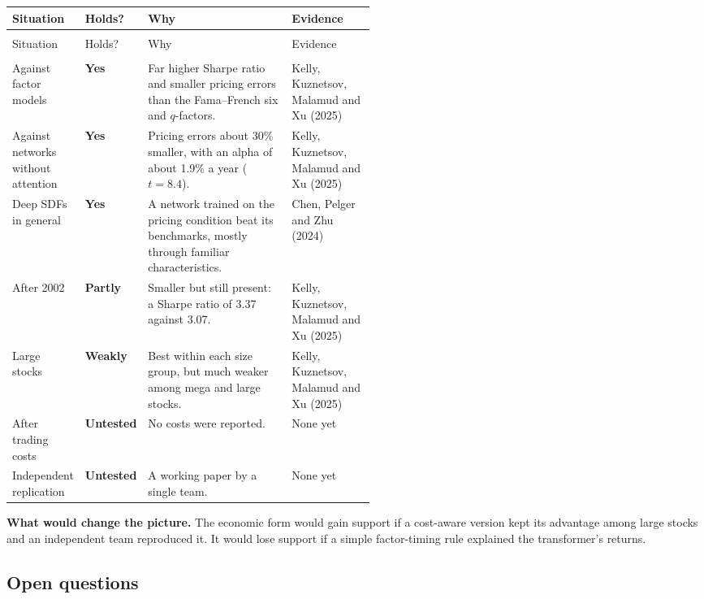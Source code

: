 {\small
\begin{longtable}{@{}>{\raggedright\arraybackslash}p{0.19\linewidth}>{\raggedright\arraybackslash}p{0.10\linewidth}>{\raggedright\arraybackslash}p{}>{\raggedright\arraybackslash}p{0.23\linewidth}@{}}
\toprule
Situation & Holds? & Why & Evidence \\
\midrule
\endfirsthead
\multicolumn{4}{@{}l}{\emph{(continued)}} \\
\toprule
Situation & Holds? & Why & Evidence \\
\midrule
\endhead
\midrule
\multicolumn{4}{r@{}}{\emph{(continued on the next page)}} \\
\endfoot
\bottomrule
\endlastfoot
Against factor models & \textbf{Yes} & Far higher Sharpe ratio and smaller pricing errors than the Fama--French six and $q$-factors. & Kelly, Kuznetsov, Malamud and Xu (2025) \\
\addlinespace[3pt]
Against networks without attention & \textbf{Yes} & Pricing errors about 30\% smaller, with an alpha of about 1.9\% a year ($t = 8.4$). & Kelly, Kuznetsov, Malamud and Xu (2025) \\
\addlinespace[3pt]
Deep SDFs in general & \textbf{Yes} & A network trained on the pricing condition beat its benchmarks, mostly through familiar characteristics. & Chen, Pelger and Zhu (2024) \\
\addlinespace[3pt]
After 2002 & \textbf{Partly} & Smaller but still present: a Sharpe ratio of 3.37 against 3.07. & Kelly, Kuznetsov, Malamud and Xu (2025) \\
\addlinespace[3pt]
Large stocks & \textbf{Weakly} & Best within each size group, but much weaker among mega and large stocks. & Kelly, Kuznetsov, Malamud and Xu (2025) \\
\addlinespace[3pt]
After trading costs & \textbf{Untested} & No costs were reported. & None yet \\
\addlinespace[3pt]
Independent replication & \textbf{Untested} & A working paper by a single team. & None yet \\
\end{longtable}
}

\textbf{What would change the picture.} The economic form would gain support if a cost-aware version kept its advantage among large stocks and an independent team reproduced it. It would lose support if a simple factor-timing rule explained the transformer's returns.

\subsection{Open questions}
\label{sec:22-open}

